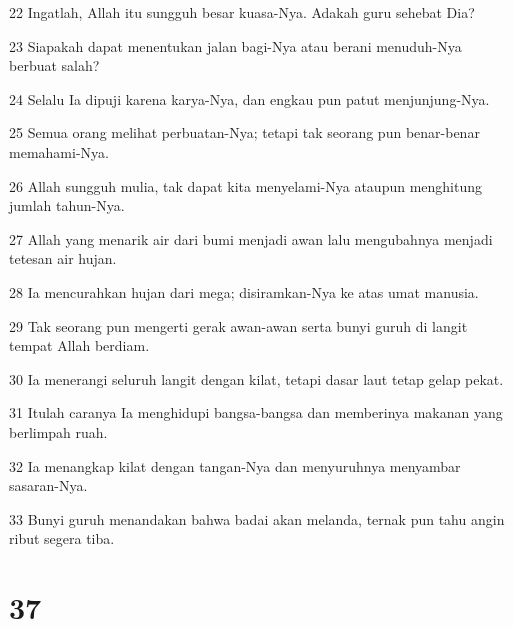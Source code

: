 \par 22 Ingatlah, Allah itu sungguh besar kuasa-Nya. Adakah guru sehebat Dia?
\par 23 Siapakah dapat menentukan jalan bagi-Nya atau berani menuduh-Nya berbuat salah?
\par 24 Selalu Ia dipuji karena karya-Nya, dan engkau pun patut menjunjung-Nya.
\par 25 Semua orang melihat perbuatan-Nya; tetapi tak seorang pun benar-benar memahami-Nya.
\par 26 Allah sungguh mulia, tak dapat kita menyelami-Nya ataupun menghitung jumlah tahun-Nya.
\par 27 Allah yang menarik air dari bumi menjadi awan lalu mengubahnya menjadi tetesan air hujan.
\par 28 Ia mencurahkan hujan dari mega; disiramkan-Nya ke atas umat manusia.
\par 29 Tak seorang pun mengerti gerak awan-awan serta bunyi guruh di langit tempat Allah berdiam.
\par 30 Ia menerangi seluruh langit dengan kilat, tetapi dasar laut tetap gelap pekat.
\par 31 Itulah caranya Ia menghidupi bangsa-bangsa dan memberinya makanan yang berlimpah ruah.
\par 32 Ia menangkap kilat dengan tangan-Nya dan menyuruhnya menyambar sasaran-Nya.
\par 33 Bunyi guruh menandakan bahwa badai akan melanda, ternak pun tahu angin ribut segera tiba.

\chapter{37}

